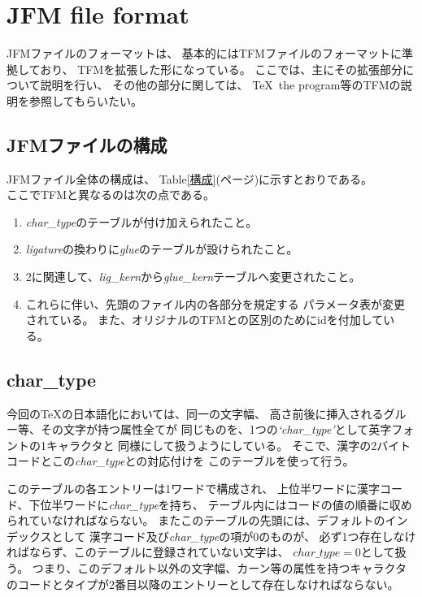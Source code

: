 \documentclass[twoside]{jarticle}
\begin{document}
\section{JFM file format}
JFMファイルのフォーマットは、
基本的にはTFMファイルのフォーマットに準拠しており、
TFMを拡張した形になっている。
ここでは、主にその拡張部分について説明を行い、
その他の部分に関しては、
\TeX\ the program等のTFMの説明を参照してもらいたい。
\subsection{JFMファイルの構成}
JFMファイル全体の構成は、
Table\ref{構成}(\pageref{構成}ページ)に示すとおりである。 \\
ここでTFMと異なるのは次の点である。
\begin{enumerate}
\item {\it char\_type}のテーブルが付け加えられたこと。
\item {\it ligature}の換わりに{\it glue}のテーブルが設けられたこと。
\item 2に関連して、{\it lig\_kern}から{\it glue\_kern}テーブルへ変更されたこと。
\item これらに伴い、先頭のファイル内の各部分を規定する
	パラメータ表が変更されている。
	また、オリジナルのTFMとの区別のためにidを付加している。
\end{enumerate}

\subsection{char\_type}
今回の\TeX の日本語化においては、同一の文字幅、
高さ前後に挿入されるグルー等、その文字が持つ属性全てが
同じものを、1つの{\it `char\_type'}として英字フォントの1キャラクタと
同様にして扱うようにしている。
そこで、漢字の2バイトコードとこの{\it char\_type}との対応付けを
このテーブルを使って行う。

このテーブルの各エントリーは1ワードで構成され、
上位半ワードに漢字コード、下位半ワードに{\it char\_type}を持ち、
テーブル内にはコードの値の順番に収められていなければならない。
またこのテーブルの先頭には、デフォルトのインデックスとして
漢字コード及び{\it char\_type}の項が0のものが、
必ず1つ存在しなければならず、このテーブルに登録されていない文字は、
$char\_type = 0$として扱う。
つまり、このデフォルト以外の文字幅、カーン等の属性を持つキャラクタ
のコードとタイプが2番目以降のエントリーとして存在しなければならない。
\end{document}
